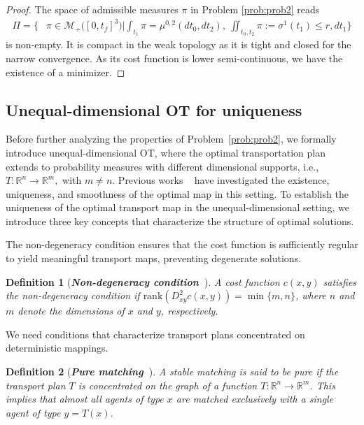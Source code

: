 \documentclass[11pt]{article}
\newtheorem{definition}{Definition}
\begin{document}
\begin{proof}
The space of admissible measures $\pi$ in Problem  \ref{prob:prob2} reads
\begin{align*}
\Pi = \Big\{&\pi \in \mathcal{M}_+\big([0, t_f]^3\big) \Big | \int_{t_1} \pi = \mu^{0,2}(dt_0,dt_2),\ \iint_{t_0, t_2} \pi:= \sigma^1(t_1) \leq r , dt_1 \Big\}
\end{align*}
is non-empty. It is compact in the weak topology as it is tight and closed for the narrow convergence. As its cost function is lower semi-continuous, we have the existence of a minimizer. 
\end{proof}


\subsection{Unequal-dimensional OT for uniqueness}
Before further analyzing the properties of Problem~\ref{prob:prob2}, we formally introduce unequal-dimensional OT, where the optimal transportation plan extends to probability measures with different dimensional supports, i.e., $T: \mathbb{R}^n \to \mathbb{R}^m,$ with $m \neq n.$ Previous works ~\cite{chiappori2016multidimensional,chiappori2017multi,chiappori2020multidimensional} have investigated the existence, uniqueness, and smoothness of the optimal map in this setting. To establish the uniqueness of the optimal transport map in the unequal-dimensional setting, we introduce three key concepts that characterize the structure of optimal solutions.



The non-degeneracy condition ensures that the cost function is sufficiently regular to yield meaningful transport maps, preventing degenerate solutions.
\begin{definition}[\bf \textit{Non-degeneracy condition}~\cite{chiappori2020multidimensional}]\label{def:non-deg}
A cost function $c(x, y)$ satisfies the non-degeneracy condition if
$\text{rank}\left(D^2_{xy} c(x,y)\right) = \min\{m, n\}$,
where $n$ and $m$ denote the dimensions of $x$ and $y$, respectively.
\end{definition}

We need conditions that characterize transport plans concentrated on deterministic mappings.
\begin{definition}[\bf \textit{Pure matching}~\cite{chiappori2016multidimensional}]\label{def:pureness}
A stable matching is said to be pure if the transport plan $T$ is concentrated on the graph of a function $T: \mathbb{R}^n \to \mathbb{R}^m$. This implies that almost all agents of type $x$ are matched exclusively with a single agent of type $y = T(x)$.
\end{definition}
\end{document}
